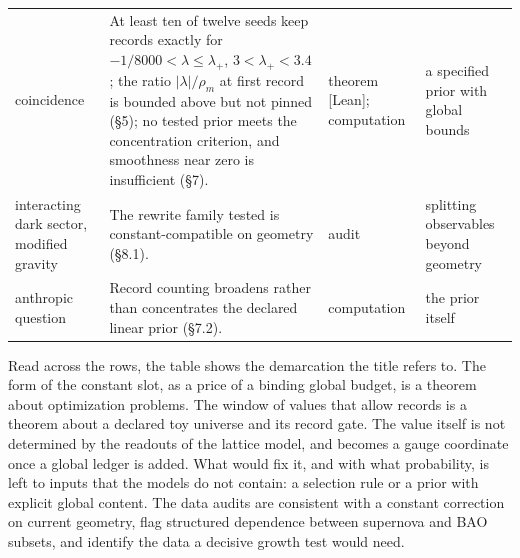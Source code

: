 \begin{table}[!htbp]
\begin{tabularx}{\textwidth}{@{}p{2.6cm}X p{2.0cm}X@{}}
coincidence & At least ten of twelve seeds keep records exactly for $-1/8000<\lambda\le\lambda_+$, $3<\lambda_+<3.4$; the ratio $|\lambda|/\rho_m$ at first record is bounded above but not pinned (\S5); no tested prior meets the concentration criterion, and smoothness near zero is insufficient (\S7). & theorem [Lean]; computation & a specified prior with global bounds \\
interacting dark sector, modified gravity & The rewrite family tested is constant-compatible on geometry (\S8.1). & audit & splitting observables beyond geometry \\
anthropic question & Record counting broadens rather than concentrates the declared linear prior (\S7.2). & computation & the prior itself \\
\bottomrule
\end{tabularx}
\end{table}

Read across the rows, the table shows the demarcation the title refers
to. The form of the constant slot, as a price of a binding global
budget, is a theorem about optimization problems. The window of values
that allow records is a theorem about a declared toy universe and its
record gate. The value itself is not determined by the readouts of the
lattice model, and becomes a gauge coordinate once a global ledger is
added. What would fix it, and with what probability, is left to inputs
that the models do not contain: a selection rule or a prior with
explicit global content. The data audits are consistent with a constant
correction on current geometry, flag structured dependence between
supernova and BAO subsets, and identify the data a decisive growth test
would need.
